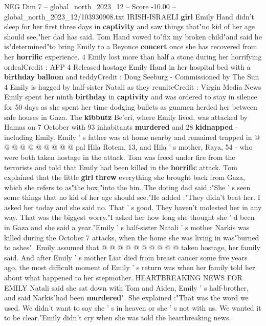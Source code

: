 \begin{textsample}{NEG Dim 7 – global\_north\_2023\_12 – Score -10.00 – global\_north\_2023\_12/103930908.txt}  \label{ex:f7_neg_141}
IRISH-ISRAELI \textbf{girl} Emily Hand didn't sleep for her first three days in \textbf{captivity} and saw things that"no kid of her age should see,"her dad has said.
Tom Hand vowed to"fix my broken child"and said he is"determined"to bring Emily to a Beyonce \textbf{concert} once she has recovered from her \textbf{horrific} experience. 4 Emily lost more than half a stone during her horrifying ordealCredit : AFP 4 Released hostage Emily Hand in her hospital bed with a \textbf{birthday} \textbf{balloon} and teddyCredit : Doug Seeburg - Commissioned by The Sun 4 Emily is hugged by half-sister Natali as they reuniteCredit : Virgin Media News Emily spent her ninth \textbf{birthday} in \textbf{captivity} and was ordered to stay in silence for 50 days as she spent her time dodging bullets as gunmen herded her between safe houses in Gaza.
The \textbf{kibbutz} Be'eri, where Emily lived, was attacked by Hamas on 7 October with 93 inhabitants \textbf{murdered} and 28 \textbf{kidnapped} - including Emily.
Emily ' s father was at home nearby and remained trapped in @ @ @ @ @ @ @ @ @ @ pal Hila Rotem, 13, and Hila ' s mother, Raya, 54 - who were both taken hostage in the attack.
Tom was freed under fire from the terrorists and told that Emily had been killed in the \textbf{horrific} attack.
Tom explained that the little \textbf{girl} \textbf{threw} everything she brought back from Gaza, which she refers to as"the box,"into the bin.
The doting dad said :"She ' s seen some things that no kid of her age should see."He added :"They didn't beat her.
I asked her today and she said no.
That ' s good.
They haven't molested her in any way.
That was the biggest worry."I asked her how long she thought she ' d been in Gaza and she said a year."Emily ' s half-sister Natali ' s mother Narkis was killed during the October 7 attacks, when the home she was living in was"burned to ashes".
Emily assumed that @ @ @ @ @ @ @ @ @ @ taken hostage, her family said.
And after Emily ' s mother Liat died from breast cancer some five years ago, the most difficult moment of Emily ' s return was when her family told her about what happened to her stepmother.
HEARTBREAKING NEWS FOR EMILY Natali said she sat down with Tom and Aiden, Emily ' s half-brother, and said Narkis"had been \textbf{murdered}".
She explained :"That was the word we used.
We didn't want to say she ' s in heaven or she ' s not with us.
We wanted it to be clear."Emily didn't cry when she was told the heartbreaking news.

\end{textsample}
